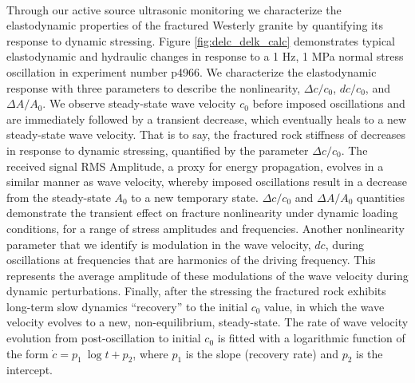 \paragraph{}
Through our active source ultrasonic monitoring we characterize the elastodynamic properties of the fractured Westerly granite by quantifying its response to dynamic stressing. Figure \ref{fig:delc_delk_calc} demonstrates typical elastodynamic and hydraulic changes in response to a 1 Hz, 1 MPa normal stress oscillation in experiment number p4966. We characterize the elastodynamic response with three parameters to describe the nonlinearity, $ \Delta c/c_0 $, $ dc/c_0 $, and $ \Delta A/A_0 $. We observe steady-state wave velocity $ c_0 $ before imposed oscillations and are immediately followed by a transient decrease, which eventually heals to a new steady-state wave velocity. That is to say, the fractured rock stiffness of decreases in response to dynamic stressing, quantified by the parameter $ \Delta c/c_0 $. 
The received signal RMS Amplitude, a proxy for energy propagation, evolves in a similar manner as wave velocity, whereby imposed oscillations result in a decrease from the steady-state  $ A_0 $ to a new temporary state. $ \Delta c/c_0 $ and $ \Delta A/A_0 $ quantities demonstrate the transient effect on fracture nonlinearity under dynamic loading conditions, for a range of stress amplitudes and frequencies. 
Another nonlinearity parameter that we identify is modulation in the wave velocity, $ dc $, during oscillations at frequencies that are harmonics of the driving frequency. This represents the average amplitude of these modulations of the wave velocity during dynamic perturbations. Finally, after the stressing the fractured rock exhibits long-term slow dynamics ``recovery'' to the initial $ c_0 $ value, in which the wave velocity evolves to a new, non-equilibrium, steady-state. The rate of wave velocity evolution from post-oscillation to initial $ c_0 $ is fitted with a logarithmic function of the form $ \dot c = p_1\ \log{t} + p_2 $, where $p_1$ is the slope (recovery rate) and $p_2$ is the intercept.

